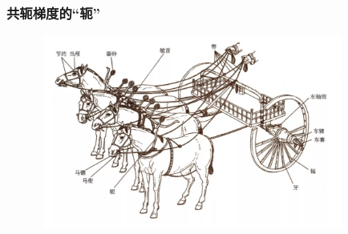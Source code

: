 \frame
{
	\frametitle{共轭梯度的``轭''}
\begin{figure}[h!]
\centering
\includegraphics[height=2.5in,width=4.0in,viewport=0 0 1050 680,clip]{Figures/Yoke_1.png}
\label{Horse_Yoke}
\end{figure}
}

